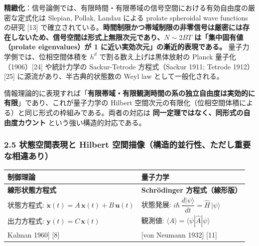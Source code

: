 \documentclass[
]{ltjsarticle}
\newcounter{none} %
\begin{document}
\textbf{精緻化}：信号論側では、有限時間・有限帯域の信号空間における有効自由度の厳密な定式化は
Slepian, Pollak, Landau による prolate spheroidal wave functions の研究
{[}13{]}
で確立されている。\textbf{時間制限かつ帯域制限の非零信号は厳密には存在しないため、信号空間は形式上無限次元であり、\(N \sim 2BT\)
は「集中固有値（prolate eigenvalues）が 1
に近い実効次元」の漸近的表現である。} 量子力学側では、位相空間体積を
\(h^d\) で割る数え上げは黒体放射の Planck 量子化（1906）{[}24{]}
や統計力学の Sackur-Tetrode 方程式（Sackur 1911; Tetrode 1912）{[}25{]}
に源流があり、半古典的状態数の Weyl law として一般化される。

情報理論的に表現すれば「\textbf{有限帯域・有限観測時間の系の独立自由度は実効的に有限}」であり、これが量子力学の
Hilbert
空間次元の有限化（位相空間体積による）と同じ形式の枠組みである。両者の対応は
\textbf{同一定理ではなく、同形式の自由度カウント}
という強い構造的対応である。

\subsubsection{2.5 状態空間表現と Hilbert
空間描像（構造的並行性、ただし重要な相違あり）}\label{ux72b6ux614bux7a7aux9593ux8868ux73feux3068-hilbert-ux7a7aux9593ux63cfux50cfux69cbux9020ux7684ux4e26ux884cux6027ux305fux3060ux3057ux91cdux8981ux306aux76f8ux9055ux3042ux308a}

{\def\LTcaptype{none} %
\begin{longtable}[]{@{}
  >{\raggedright\arraybackslash}p{}
  >{\raggedright\arraybackslash}p{}@{}}
\toprule\noalign{}
\begin{minipage}[b]{\linewidth}\raggedright
制御理論
\end{minipage} & \begin{minipage}[b]{\linewidth}\raggedright
量子力学
\end{minipage} \\
\midrule\noalign{}
\endhead
\bottomrule\noalign{}
\endlastfoot
\textbf{線形状態方程式} & \textbf{Schrödinger 方程式（線形版）} \\
状態方程式:
\(\dot{\mathbf{x}}(t) = A\,\mathbf{x}(t) + B\,\mathbf{u}(t)\) &
状態発展:
\(i\hbar\,\dfrac{d|\psi\rangle}{dt} = \hat{H}\,|\psi\rangle\) \\
出力方程式: \(\mathbf{y}(t) = C\,\mathbf{x}(t)\) & 観測値:
\(\langle A\rangle = \langle\psi|\hat{A}|\psi\rangle\) \\
{[}Kalman 1960{]} {[}8{]} & {[}von Neumann 1932{]} {[}11{]} \\
\end{longtable}
}
\end{document}
